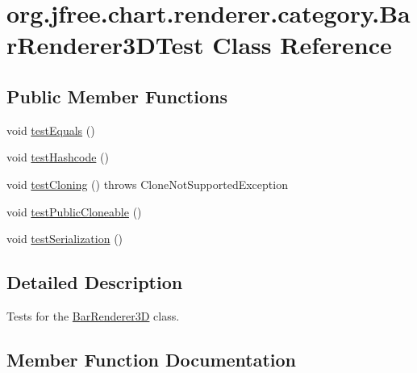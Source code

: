 \hypertarget{classorg_1_1jfree_1_1chart_1_1renderer_1_1category_1_1_bar_renderer3_d_test}{}\section{org.\+jfree.\+chart.\+renderer.\+category.\+Bar\+Renderer3\+D\+Test Class Reference}
\label{classorg_1_1jfree_1_1chart_1_1renderer_1_1category_1_1_bar_renderer3_d_test}
\subsection*{Public Member Functions}
\begin{DoxyCompactItemize}
\item 
void \mbox{\hyperlink{classorg_1_1jfree_1_1chart_1_1renderer_1_1category_1_1_bar_renderer3_d_test_a91ad269f18e1b1bf6fadefed5d0ae7bb}{test\+Equals}} ()
\item 
void \mbox{\hyperlink{classorg_1_1jfree_1_1chart_1_1renderer_1_1category_1_1_bar_renderer3_d_test_a028451b4bb556bdc4f71c3b2fdbad4e2}{test\+Hashcode}} ()
\item 
void \mbox{\hyperlink{classorg_1_1jfree_1_1chart_1_1renderer_1_1category_1_1_bar_renderer3_d_test_ab5f0617c93b504d0f7a225c7629242f5}{test\+Cloning}} ()  throws Clone\+Not\+Supported\+Exception 
\item 
void \mbox{\hyperlink{classorg_1_1jfree_1_1chart_1_1renderer_1_1category_1_1_bar_renderer3_d_test_a0a30c464e88fd5ce955562c01294ea78}{test\+Public\+Cloneable}} ()
\item 
void \mbox{\hyperlink{classorg_1_1jfree_1_1chart_1_1renderer_1_1category_1_1_bar_renderer3_d_test_a2c56c7b49fa6e54463ddbb839f8abecd}{test\+Serialization}} ()
\end{DoxyCompactItemize}


\subsection{Detailed Description}
Tests for the \mbox{\hyperlink{classorg_1_1jfree_1_1chart_1_1renderer_1_1category_1_1_bar_renderer3_d}{Bar\+Renderer3D}} class. 

\subsection{Member Function Documentation}
\mbox{\label{classorg_1_1jfree_1_1chart_1_1renderer_1_1category_1_1_bar_renderer3_d_test_ab5f0617c93b504d0f7a225c7629242f5}} 
